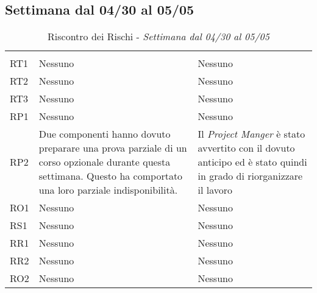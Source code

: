 \subsection{Settimana dal 04/30 al 05/05}
\label{sec:2SettRischi}
\begin{table}[H]
	\centering
	\begin{tabular}{|C{2.5cm}|C{5cm}|C{5cm}|}
		 & & \\
		RT1  & Nessuno & Nessuno \\
		\hline
		RT2  & Nessuno & Nessuno \\
		\hline
		RT3  & Nessuno & Nessuno \\
		\hline
		RP1  & Nessuno & Nessuno \\
		\hline
		RP2  & Due componenti hanno dovuto preparare una prova parziale di un corso opzionale durante questa settimana. Questo ha comportato una loro parziale indisponibilità. & Il \textit{Project Manger} è stato avvertito con il dovuto anticipo ed è stato quindi in grado di riorganizzare il lavoro  \\
		\hline
		RO1  & Nessuno & Nessuno \\
		\hline
		RS1  & Nessuno & Nessuno \\
		\hline
		RR1  & Nessuno & Nessuno \\
		\hline
		RR2  & Nessuno & Nessuno \\
		\hline
		RO2  & Nessuno & Nessuno \\
		\hline
	\end{tabular}
	\caption{Riscontro dei Rischi - \textit{Settimana dal 04/30 al 05/05}}
\end{table}